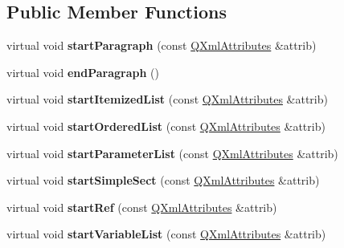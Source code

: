 \subsection*{Public Member Functions}
\begin{DoxyCompactItemize}
\item 
\mbox{\label{class_paragraph_handler_af56ab86b368c75d593b60c2f9f15ca3a}} 
virtual void {\bfseries start\+Paragraph} (const \mbox{\hyperlink{class_q_xml_attributes}{Q\+Xml\+Attributes}} \&attrib)
\item 
\mbox{\label{class_paragraph_handler_ade8a39dec7a74310e5528756046be389}} 
virtual void {\bfseries end\+Paragraph} ()
\item 
\mbox{\label{class_paragraph_handler_a18825f31985bed21fdfbb810f082ffd8}} 
virtual void {\bfseries start\+Itemized\+List} (const \mbox{\hyperlink{class_q_xml_attributes}{Q\+Xml\+Attributes}} \&attrib)
\item 
\mbox{\label{class_paragraph_handler_a96cf596f30f5f8b636763e1ebe3ee64f}} 
virtual void {\bfseries start\+Ordered\+List} (const \mbox{\hyperlink{class_q_xml_attributes}{Q\+Xml\+Attributes}} \&attrib)
\item 
\mbox{\label{class_paragraph_handler_a83f3a542b74242dc7e604976a3f97ab7}} 
virtual void {\bfseries start\+Parameter\+List} (const \mbox{\hyperlink{class_q_xml_attributes}{Q\+Xml\+Attributes}} \&attrib)
\item 
\mbox{\label{class_paragraph_handler_a053036714297dbb2fe5b88f967bc9a57}} 
virtual void {\bfseries start\+Simple\+Sect} (const \mbox{\hyperlink{class_q_xml_attributes}{Q\+Xml\+Attributes}} \&attrib)
\item 
\mbox{\label{class_paragraph_handler_a04f69561d94b04c0a6695c7babb28e51}} 
virtual void {\bfseries start\+Ref} (const \mbox{\hyperlink{class_q_xml_attributes}{Q\+Xml\+Attributes}} \&attrib)
\item 
\mbox{\label{class_paragraph_handler_a1f2f984397377092a3e1a77a71d1dc73}} 
virtual void {\bfseries start\+Variable\+List} (const \mbox{\hyperlink{class_q_xml_attributes}{Q\+Xml\+Attributes}} \&attrib)

\end{DoxyCompactItemize}
